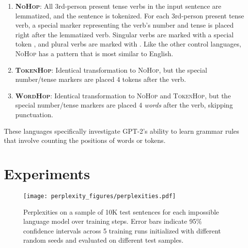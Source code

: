 \documentclass[11pt]{article}
\newcommand{\singularmarker}{%
  \setlength{\fboxsep}{1pt}%
  \fbox{\texttt{S}}%
}
\newcommand{\pluralmarker}{%
  \setlength{\fboxsep}{1pt}%
  \fbox{\texttt{P}}%
}
\begin{document}
\begin{enumerate}
    \item \textbf{\textcolor{NoHop}{\textsc{NoHop}}}: All 3rd-person present tense verbs in the input sentence are lemmatized, and the sentence is tokenized. For each 3rd-person present tense verb, a special marker representing the verb's number and tense is placed right after the lemmatized verb. Singular verbs are marked with a special token \singularmarker, and plural verbs are marked with \pluralmarker. Like the other control languages, \textsc{NoHop} has a pattern that is most similar to English.

    \item \textbf{\textcolor{tokenhop}{\textsc{TokenHop}}}: Identical transformation to \textsc{NoHop}, but the special number/tense markers are placed 4 tokens after the verb.

    \item \textbf{\textcolor{wordhop}{\textsc{WordHop}}}: Identical transformation to \textsc{NoHop} and \textsc{TokenHop}, but the special number/tense markers are placed 4 \emph{words} after the verb, skipping punctuation.
    
\end{enumerate}

\vspace{6pt}
\noindent
These languages specifically investigate GPT-2's ability to learn grammar rules that involve counting the positions of words or tokens.

\section{Experiments}

\begin{figure*}
    \centering
     \texttt{[image: perplexity\_figures/perplexities.pdf]}
    \caption{Perplexities on a sample of 10K test sentences for each
    impossible language model over training steps. Error bars indicate 95\% confidence intervals across 5 training runs initialized with different random seeds and evaluated on different test samples.}
    \label{fig:perplexities}
\end{figure*}
\end{document}
